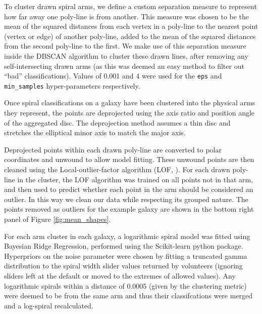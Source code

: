 \documentclass[../main.tex]{subfiles}
\begin{document}
To cluster drawn spiral arms, we define a custom separation measure to represent how far away one poly-line is from another. This measure was chosen to be the mean of the squared distances from each vertex in a poly-line to the nearest point (vertex or edge) of another poly-line, added to the mean of the squared distances from the second poly-line to the first. We make use of this separation measure inside the DBSCAN algorithm to cluster these drawn lines, after removing any self-intersecting drawn arms (as this was deemed an easy method to filter out ``bad'' classifications). Values of 0.001 and 4 were used for the \texttt{eps} and \texttt{min\_samples} hyper-parameters respectively.

Once spiral classifications on a galaxy have been clustered into the physical arms they represent, the points are deprojected using the axis ratio and position angle of the aggregated disc. The deprojection method assumes a thin disc and stretches the elliptical minor axis to match the major axis.

Deprojected points within each drawn poly-line are converted to polar coordinates and unwound to allow model fitting. These unwound points are then cleaned using the Local-outlier-factor algorithm (LOF, \citealt{local-outlier-factor}). For each drawn poly-line in the cluster, the LOF algorithm was trained on all points not in that arm, and then used to predict whether each point in the arm should be considered an outlier. In this way we clean our data while respecting its grouped nature. The points removed as outliers for the example galaxy are shown in the bottom right panel of Figure \ref{fig:mean_shapes}.

\begin{figure*}
  \caption{Calculated aggregate components for UGC 4721. The aggregate disc is shown using a dot-dashed line and blue fill in the upper left panel, the aggregate bulge with a dotted line and orange fill in the upper right panel, the aggregate bar using a dashed line and green fill in the lower left panel and the aggregate spiral arms are plotted as red lines in the lower right panel. S\'ersic components are displayed at twice their effective radii. Black crosses in the lower right panel indicate spiral arm points that were identified as outliers and removed during cleaning.}
  \label{fig:mean_shapes}
\end{figure*}


For each arm cluster in each galaxy, a logarithmic spiral model was fitted using Bayesian Ridge Regression, performed using the Scikit-learn python package. Hyperpriors on the noise parameter were chosen by fitting a truncated gamma distribution \citep{2014arXiv1401.0287Z} to the spiral width slider values returned by volunteers (ignoring sliders left at the default or moved to the extremes of allowed values). Any logarithmic spirals within a distance of 0.0005 (given by the clustering metric) were deemed to be from the same arm and thus their classifcations were merged and a log-spiral recalculated.
\end{document}
